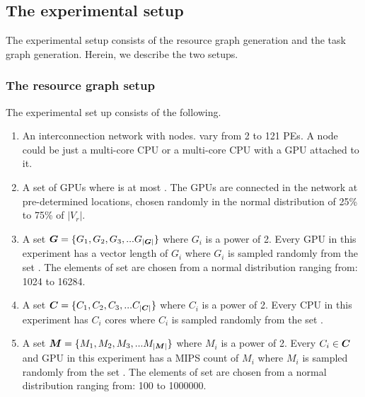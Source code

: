 \subsection{The experimental setup}
\label{sec:experimental-setup}

The experimental setup consists of the resource graph generation and the
task graph generation. Herein, we describe the two setups.

\subsubsection{The resource graph setup}
\label{sec:resource-graph-setup}

The experimental set up consists of the following.

\begin{enumerate}

\item An interconnection network with \numtplgynodes
  nodes. \numtplgynodes vary from 2 to 121 PEs. A node could be just a
  multi-core CPU or a multi-core CPU with a GPU attached to it.

\item A set of \gpunum GPUs where \gpunum is at most \numtplgynodes. The
  GPUs are connected in the network at pre-determined locations, chosen
  randomly in the normal distribution of 25\% to 75\% of $|V_r|$.

\item A set $\bm{G} = \{G_1, G_2, G_3, ... G_{|\bm{G}|}\}$ where
  $G_i$ is a power of 2.  Every GPU in this experiment has a vector
  length of $G_i$ where $G_i$ is sampled randomly from the set
  \veclenset. The elements of set \veclenset are chosen from a normal
  distribution ranging from: 1024 to 16284.

\item A set $\bm{C} = \{C_1, C_2, C_3, ... C_{|\bm{C}|}\}$
  where $C_i$ is a power of 2.  Every CPU in this experiment has $C_i$
  cores where $C_i$ is sampled randomly from the set \corenumset.

\item A set $\bm{M} = \{M_1, M_2, M_3, ... M_{|\bm{M}|}\}$ where
  $M_i$ is a power of 2.  Every $C_i \in \bm{C}$ and GPU in this
  experiment has a MIPS count of $M_i$ where $M_i$ is sampled randomly
  from the set \mipsset. The elements of set \mipsset are chosen from a
  normal distribution ranging from: 100 to 1000000.

\end{enumerate}

